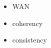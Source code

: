 










\begin{itemize}
	\item \cite{Breslow2004} WAN
	\item coherency
	\item consistency
\end{itemize}


